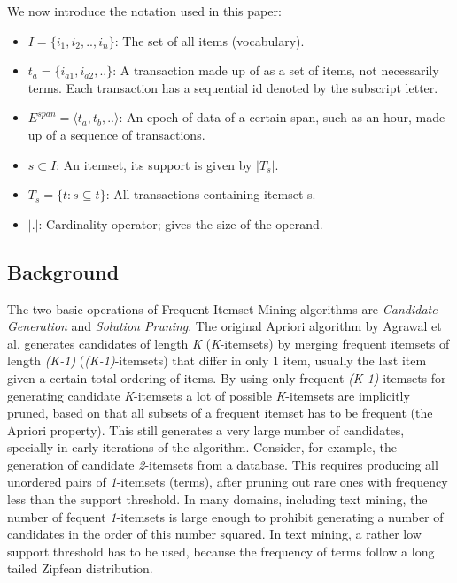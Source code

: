 \documentclass{sig-alternate}
\begin{document}

We now introduce the notation used in this paper:

\begin{itemize}
\item $I = \{i_1,i_2,..,i_n\}$: The set of all items (vocabulary).
\item $t_a = \{i_{a1},i_{a2},..\}$: A transaction made up of as a set of items, not necessarily terms. Each transaction has a sequential id denoted by the subscript letter.
\item $E^{span} = \langle t_a, t_b, ..\rangle$: An epoch of data of a certain span, such as an hour, made up of a sequence of transactions.
\item $s \subset I$: An itemset, its support is given by $|T_s|$.
\item $T_s = \{t: s \subseteq t\}$: All transactions containing itemset s.
\item $|.|$: Cardinality operator; gives the size of the operand.

\end{itemize}

\subsection{Background}

The two basic operations of Frequent Itemset Mining algorithms are \emph{Candidate Generation} and \emph{Solution Pruning}. The original Apriori algorithm by Agrawal et al. \cite{agrawal1994fast} generates candidates of length \emph{K} (\emph{K}-itemsets) by merging frequent itemsets of length \emph{(K-1)} (\emph{(K-1)}-itemsets) that differ in only 1 item, usually the last item given a certain total ordering of items. By using only frequent  \emph{(K-1)}-itemsets for generating candidate \emph{K}-itemsets a lot of possible \emph{K}-itemsets are implicitly pruned, based on that all subsets of a frequent itemset has to be frequent (the Apriori property). This still generates a very large number of candidates, specially in early iterations of the algorithm. Consider, for example, the generation of candidate \emph{2}-itemsets from a database. This requires producing all unordered pairs of \emph{1}-itemsets (terms), after pruning out rare ones with frequency less than the support threshold. In many domains, including text mining, the number of fequent \emph{1}-itemsets is large enough to prohibit generating a number of candidates in the order of this number squared. In text mining, a rather low support threshold has to be used, because the frequency of terms follow a long tailed Zipfean distribution.
\end{document}
